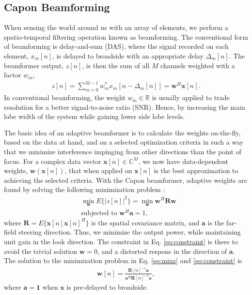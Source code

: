 \documentclass[journal]{IEEEtran}
\newcommand{\mat}[1]{\mathbf{#1}}
\renewcommand{\vec}[1]{\mathbf{#1}}
\begin{document}
\subsection{Capon Beamforming}
When sensing the world around us with an array of elements, we perform a spatio-temporal filtering operation known as beamforming. The conventional form of beamforming is delay-and-sum (DAS), where the signal recorded on each element, $x_m[n]$, is delayed to broadside with an appropriate delay $\Delta_m[n]$. The beamformer output, $z[n]$, is then the sum of all $M$ channels weighted with a factor $w_m$,
\begin{align}
z[n] = \sum_{m = 0}^{M-1}w_m^*x_m[n - \Delta_m[n]] = \vec{w}^H\vec{x}[n].
\end{align}
In conventional beamforming, the weight $w_m \in \mathbb{R}$ is usually applied to trade resolution for a better signal-to-noise ratio (SNR). Hence, by increasing the main lobe width of the system while gaining lower side lobe levels. 

The basic idea of an adaptive beamformer is to calculate the weights on-the-fly, based on the data at hand, and on a selected optimization criteria in such a way that we minimize interference impinging from other directions than the point of focus. For a complex data vector $\vec{x}[n] \in \mathbb{C}^M$, we now have data-dependent weights, $\vec{w}(\vec{x}[n])$, that when applied on $\vec{x}[n]$ is the best approximation to achieving the selected criteria. With the Capon beamformer, adaptive weights are found by solving the following minimization problem \cite{Capon1969}:
\begin{align}
&\min_{\vec{w}} E\{|z[n]|^2\} = \min_{\vec{w}}\vec{w}^H\mat{R}\vec{w}\label{eq:minz}\\
&\text{subjected to } \vec{w}^H\vec{a} = 1,\label{eq:constraint}
\end{align}
where $\mat{R} = E\{\vec{x}[n]\vec{x}[n]^H\}$ is the spatial covariance matrix, and $\vec{a}$ is the far-field steering direction.
Thus, we minimize the output power, while maintaining unit gain in the look direction. The constraint in Eq. \ref{eq:constraint} is there to avoid the trivial solution $\vec{w} = 0$, and a distorted respons in the direction of $\vec{a}$. The solution to the minimization problem in Eq. \ref{eq:minz} and \ref{eq:constraint} is
\begin{align}\label{eq:w}
\vec{w}[n] = \frac{\mat{R}[n]^{-1}\vec{a}}{\vec{a}^H\mat{R}[n]^{-1}\vec{a}},
\end{align}
where $\vec{a} = \vec{1}$ when $\vec{x}$ is pre-delayed to broadside. 
\end{document}
